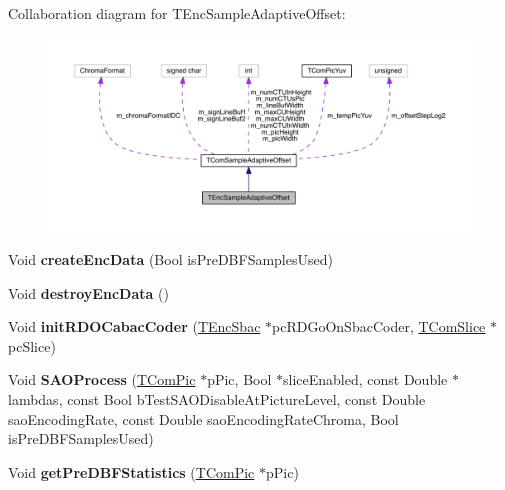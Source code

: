 Collaboration diagram for T\+Enc\+Sample\+Adaptive\+Offset\+:
\nopagebreak
\begin{figure}[H]
\begin{center}
\leavevmode
\includegraphics[width=350pt]{df/da4/class_t_enc_sample_adaptive_offset__coll__graph}
\end{center}
\end{figure}
\begin{DoxyCompactItemize}
\item 
\mbox{\label{class_t_enc_sample_adaptive_offset_a013238949cc6ec1d869371ab28d18c6f}} 
Void {\bfseries create\+Enc\+Data} (Bool is\+Pre\+D\+B\+F\+Samples\+Used)
\item 
\mbox{\label{class_t_enc_sample_adaptive_offset_a007e80f29e6104106daa479646efdbe8}} 
Void {\bfseries destroy\+Enc\+Data} ()
\item 
\mbox{\label{class_t_enc_sample_adaptive_offset_ae8a085fd35db9c37bac9b378cc753c32}} 
Void {\bfseries init\+R\+D\+O\+Cabac\+Coder} (\hyperlink{class_t_enc_sbac}{T\+Enc\+Sbac} $\ast$pc\+R\+D\+Go\+On\+Sbac\+Coder, \hyperlink{class_t_com_slice}{T\+Com\+Slice} $\ast$pc\+Slice)
\item 
\mbox{\label{class_t_enc_sample_adaptive_offset_a0b793f5eef1e67df92628f58c71b74cd}} 
Void {\bfseries S\+A\+O\+Process} (\hyperlink{class_t_com_pic}{T\+Com\+Pic} $\ast$p\+Pic, Bool $\ast$slice\+Enabled, const Double $\ast$lambdas, const Bool b\+Test\+S\+A\+O\+Disable\+At\+Picture\+Level, const Double sao\+Encoding\+Rate, const Double sao\+Encoding\+Rate\+Chroma, Bool is\+Pre\+D\+B\+F\+Samples\+Used)
\item 
\mbox{\label{class_t_enc_sample_adaptive_offset_a86e43586faaa5da430d4eb00169a5425}} 
Void {\bfseries get\+Pre\+D\+B\+F\+Statistics} (\hyperlink{class_t_com_pic}{T\+Com\+Pic} $\ast$p\+Pic)
\end{DoxyCompactItemize}
